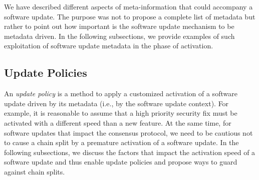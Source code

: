 We have described different aspects of meta-information that could accompany a software update. The purpose was not to propose a complete list of metadata but rather to point out how important is the software update mechanism to be metadata driven. In the following subsections, we provide examples of such exploitation of software update metadata in the phase of activation.

\subsection{Update Policies} 
An \emph{update policy} is a method to apply a customized activation of a software update driven by its metadata (i.e., by the software update context). For example, it is reasonable to assume that a high priority security fix must be activated with a different speed than a  new feature. At the same time, for software updates that impact the consensus protocol, we need to be cautious not to cause a chain split by a premature activation of a software update.
In the following subsections, we discuss the factors that impact the activation speed of a software update and thus enable update policies and propose ways to guard against chain splits.
 



